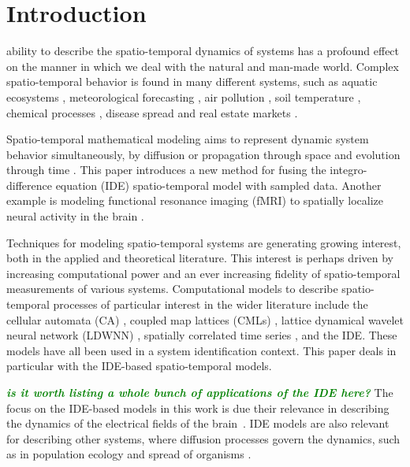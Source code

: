 \documentclass[10pt,twocolumn,twoside]{IEEEtran}
\newcommand{\mike}[1]{\textsf{\emph{\textbf{\textcolor{green}{#1}}}}}
\begin{document}
\IEEEpeerreviewmaketitle

\section{Introduction}
 ability to describe the spatio-temporal dynamics of systems has a profound effect on the manner in which we deal with the natural and man-made world.
Complex spatio-temporal behavior is found in many different systems, such as aquatic ecosystems \cite{Schofield2002}, meteorological forecasting \cite{Xu2005}, air pollution \cite{Romanowicz2006}, soil temperature  \cite{Bond-Lamberty2005}, chemical processes \cite{Deng2005}, disease spread \cite{Kuo2009} and real estate markets \cite{Pace2000,Sun2005}.

Spatio-temporal mathematical modeling aims to represent dynamic system behavior simultaneously, by diffusion or propagation through space and evolution through time \cite{Cressie2011}.
This paper introduces a new method for fusing the integro-difference equation (IDE) spatio-temporal model with sampled data.
Another example is modeling functional resonance imaging (fMRI) to spatially localize neural activity in the brain \cite{Woolrich2004}.

Techniques for modeling spatio-temporal systems are generating growing interest, both in the applied and theoretical literature.
This interest is perhaps driven by increasing computational power and an ever increasing fidelity of spatio-temporal measurements of various systems.
Computational models to describe spatio-temporal processes of particular interest in the wider literature include the cellular automata (CA) \cite{Wolfram1994}, coupled map lattices (CMLs) \cite{Billings2002}, lattice dynamical wavelet neural network (LDWNN) \cite{Wei2009}, spatially correlated time series \cite{Pfeifer1980,Glasbey2008,Dewar2007}, and the IDE\@.
These models have all been used in a system identification context.
This paper deals in particular with the IDE-based spatio-temporal models.

\mike{is it worth listing a whole bunch of applications of the IDE here?}
The focus on the IDE-based models in this work is due their relevance in describing the dynamics of the electrical fields of the brain~\cite{Deco2008,Schiff2008,Freestone2011,Aram2012}.
IDE models are also relevant for describing other systems, where diffusion processes govern the dynamics, such as in population ecology and spread of organisms \cite{Kot1992,Kot1996}.
\end{document}
